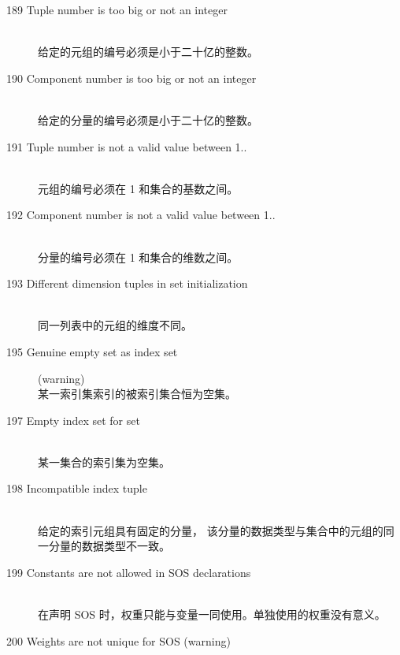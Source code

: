 \begin{description}
\item[189 Tuple number  is too big or not an integer]\ \\
  给定的元组的编号必须是小于二十亿的整数。
\item[190 Component number  is too big or not an integer]\ \\
  给定的分量的编号必须是小于二十亿的整数。
\item[191 Tuple number  is not a valid value between 1..]\ \\
  元组的编号必须在 1 和集合的基数之间。
\item[192 Component number  is not a valid value between 1..]\ \\
  分量的编号必须在 1 和集合的维数之间。
\item[193 Different dimension tuples in set initialization]\ \\
  同一列表中的元组的维度不同。
\item[195 Genuine empty set as index set] (warning)\ \\
  某一索引集索引的被索引集合恒为空集。
\item[197 Empty index set for set]\ \\
  某一集合的索引集为空集。
\item[198 Incompatible index tuple]\ \\
  给定的索引元组具有固定的分量，
  该分量的数据类型与集合中的元组的同一分量的数据类型不一致。
\item[199 Constants are not allowed in SOS declarations]\ \\
  在声明 SOS 时，权重只能与变量一同使用。单独使用的权重没有意义。
\item[200 Weights are not unique for SOS  (warning)]\ \\

\end{description}
